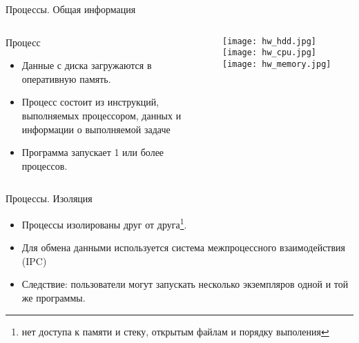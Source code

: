 \begin{frame}{Процессы. Общая информация}
\begin{columns}
  \begin{block}{Процесс}
    \begin{itemize}
      \item Данные с диска загружаются в оперативную память.
      \item Процесс состоит из инструкций, выполняемых процессором, данных и информации о выполняемой задаче 
      \item Программа запускает 1 или более процессов. 
    \end{itemize} 
  \end{block}
        \texttt{[image: hw\_hdd.jpg]} \break
        \texttt{[image: hw\_cpu.jpg]} \break
        \texttt{[image: hw\_memory.jpg]} 
\end{columns}
\end{frame}

\begin{frame}{Процессы. Изоляция}
    \begin{itemize}
      \item Процессы изолированы друг от друга\footnote{нет доступа к памяти и стеку, открытым файлам и порядку выполения}.
      \item Для обмена данными используется система межпроцессного взаимодействия (IPC)
      \item Следствие: пользователи могут запускать несколько экземпляров одной и той же программы. 
    \end{itemize}
\end{frame}


